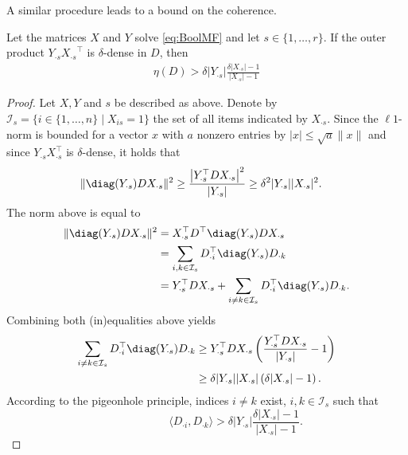 %
A similar procedure leads to a bound on the coherence.
\begin{lemma} \label{thm:minCohTile}
Let the matrices $X$ and $Y$ solve \eqref{eq:BoolMF} and let $s\in\{1,\ldots,r\}$. If the outer product $Y_{\cdot s}{X_{\cdot s}}^\top$ is $\delta$-dense in $D$, then
\begin{align}
\eta(D) > \delta\lvert Y_{\cdot s}\rvert \frac{\delta\lvert X_{\cdot s}\rvert -1}{\lvert X_{\cdot s}\rvert -1}\label{eq:minCohTile}
\end{align}
\end{lemma}
%
\begin{proof}
Let $X,Y$ and $s$ be described as above. Denote by $\mathcal{I}_s=\{i\in\{1,\ldots, n\}\mid X_{is}=1\}$ the set of all items indicated by $X_{\cdot s}$. Since the $\ell1$-norm is bounded for a vector $x$ with $a$ nonzero entries by $\lvert x\rvert \leq\sqrt{a}\lVert x\rVert $ and since $Y_{\cdot s}X_{\cdot s}^\top$ is $\delta$-dense, it holds that
\begin{align*}
\lVert \diag(Y_{\cdot s})DX_{\cdot s}\rVert ^2
&\geq \frac{\bigl\lvert Y_{\cdot s}^\top DX_{\cdot s}\bigr\rvert ^2}{\lvert Y_{\cdot s}\rvert }\geq \delta^2\lvert Y_{\cdot s}\rvert \lvert X_{\cdot s}\rvert ^2.
\end{align*} 
The norm above is equal to
\begin{align*}
\lVert \diag(Y_{\cdot s})DX_{\cdot s}\rVert ^2& = X_{\cdot s}^\top D^\top\diag(Y_{\cdot s})DX_{\cdot s}\\
&=\sum_{i,k\in\mathcal{I}_s} D_{\cdot i}^\top \diag(Y_{\cdot s})D_{\cdot k}\\
&= Y_{\cdot s}^\top DX_{\cdot s}+\sum_{i\neq k\in\mathcal{I}_s}D_{\cdot i}^\top \diag(Y_{\cdot s})D_{\cdot k}.
\end{align*}
Combining both (in)equalities above yields
\begin{align*}
\sum_{i\neq k\in\mathcal{I}_s}D_{\cdot i}^\top \diag(Y_{\cdot s})D_{\cdot k}& \geq Y_{\cdot s}^\top DX_{\cdot s}\left(\frac{Y_{\cdot s}^\top DX_{\cdot s}}{\lvert Y_{\cdot s}\rvert }-1\right)\\
&\geq \delta\lvert Y_{\cdot s}\rvert \lvert X_{\cdot s}\rvert \left(\delta\lvert X_{\cdot s}\rvert -1\right).
\end{align*}
According to the pigeonhole principle, indices $i\neq k$ exist, $i,k\in\mathcal{I}_s$ such that
\begin{displaymath}
~\qquad\qquad\quad\langle D_{\cdot i}, D_{\cdot k}\rangle
> \delta\lvert Y_{\cdot s}\rvert \frac{\delta\lvert X_{\cdot s}\rvert -1}{\lvert X_{\cdot s}\rvert -1}.
\end{displaymath}
\end{proof}
